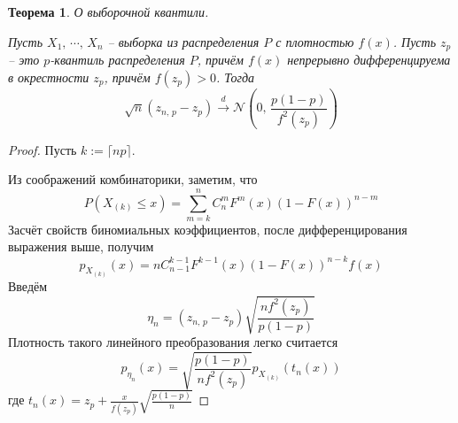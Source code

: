 \documentclass[a4paper,12pt]{article}
\renewcommand{\leq}{\ensuremath{\leqslant}}
\theoremstyle{plain}
\newtheorem{theorem}{Теорема}[section]
\theoremstyle{definition}
\theoremstyle{remark}
\begin{document}
\begin{theorem}
  О выборочной квантили.

  Пусть $X_1,\,\cdots,\,X_n$ -- выборка из распределения $P$ с плотностью $f(x)$. Пусть $z_p$ -- это $p$-квантиль распределения $P$, причём $f(x)$ непрерывно дифференцируема в окрестности $z_p$, причём $f(z_p) > 0$. Тогда
  \[
    \sqrt{n}(z_{n,\,p} - z_p) \overset{d}{\to} \mathcal{N}\left(0,\, \frac{p(1 - p)}{f^2(z_p)}\right)
  \]
\end{theorem}

\begin{proof}
  Пусть $k := \lceil np\rceil$.
  
  Из соображений комбинаторики, заметим, что
  \[
    P(X_{(k)} \leq x) = \sum_{m = k}^n C_n^m F^m(x)(1 - F(x))^{n - m}
  \]
  Засчёт свойств биномиальных коэффициентов, после дифференцирования выражения выше, получим
  \[
    p_{X_{(k)}}(x) = nC_{n-1}^{k-1}F^{k - 1}(x)(1 - F(x))^{n - k}f(x)
  \]
  Введём
  \[
    \eta_n = (z_{n,\,p} - z_p)\sqrt{\frac{nf^2(z_p)}{p(1 - p)}}
  \]
  Плотность такого линейного преобразования легко считается
  \[
    p_{\eta_n}(x) = \sqrt{\frac{p(1 - p)}{nf^2(z_p)}}p_{X_{(k)}}(t_n(x))
  \]
  где $t_n(x) = z_p + \frac{x}{f(z_p)}\sqrt{\frac{p(1 - p)}{n}}$


\end{proof}
\end{document}
